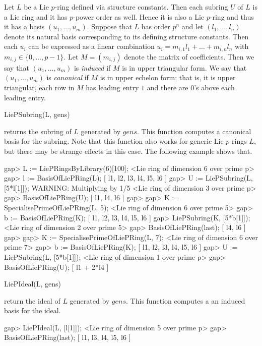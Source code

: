 
Let $L$ be a Lie $p$-ring defined via structure constants. Then each subring 
$U$ of $L$ is a Lie ring and it has $p$-power order as well. Hence it is also
a Lie $p$-ring and thus it has a basis $(u_1, \ldots, u_m)$. Suppose that 
$L$ has order $p^n$ and let $(l_1, \ldots, l_n)$ denote its natural basis
corresponding to its defining structure constants. Then each $u_i$ can be
expressed as a linear combination $u_i = m_{i,1} l_1 + \ldots + m_{i,n} l_n$
with $m_{i,j} \in \{0, \ldots, p-1\}$. Let $M = (m_{i,j})$ denote the matrix
of coefficients. Then we say that $(u_1, \ldots, u_m)$ is {\it induced} 
if $M$ is in upper triangular form. We say that $(u_1, \ldots, u_m)$ is
{\it canonical} if $M$ is in upper echelon form; that is, it is upper 
triangular, each row in $M$ has leading entry $1$ and there are $0$'s 
above each leading entry.

\> LiePSubring(L, gens)

returns the subring of $L$ generated by $gens$. This function computes
a canonical basis for the subring. Note that this function also works for
generic Lie $p$-rings $L$, but there may be strange effects in this case.
The following example shows that.

\beginexample
gap> L := LiePRingsByLibrary(6)[100];
<Lie ring of dimension 6 over prime p>
gap> l := BasisOfLiePRing(L);
[ l1, l2, l3, l4, l5, l6 ]
gap> U := LiePSubring(L, [5*l[1]]);
WARNING: Multiplying by 1/5
<Lie ring of dimension 3 over prime p>
gap> BasisOfLiePRing(U);
[ l1, l4, l6 ]
gap>
gap> K := SpecialisePrimeOfLiePRing(L, 5);
<Lie ring of dimension 6 over prime 5>
gap> b := BasisOfLiePRing(K);
[ l1, l2, l3, l4, l5, l6 ]
gap> LiePSubring(K, [5*b[1]]);
<Lie ring of dimension 2 over prime 5>
gap> BasisOfLiePRing(last);
[ l4, l6 ]
gap>
gap> K := SpecialisePrimeOfLiePRing(L, 7);
<Lie ring of dimension 6 over prime 7>
gap> b := BasisOfLiePRing(K);
[ l1, l2, l3, l4, l5, l6 ]
gap> U := LiePSubring(L, [5*b[1]]);
<Lie ring of dimension 1 over prime p>
gap> BasisOfLiePRing(U);
[ l1 + 2*l4 ]
\endexample

\> LiePIdeal(L, gens)

return the ideal of $L$ generated by $gens$. This function computes a
an induced basis for the ideal.

\beginexample
gap> LiePIdeal(L, [l[1]]);
<Lie ring of dimension 5 over prime p>
gap> BasisOfLiePRing(last);
[ l1, l3, l4, l5, l6 ]
\endexample

